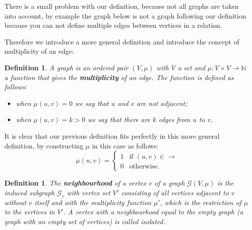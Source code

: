 \documentclass[a4paper,11pt]{report}
\newtheorem{definition}[theorem]{Definition}
\newcommand{\N}{{\mathbb N}}
\newcommand{\graf}{\mathscr{G}}
\begin{document}
There is a small problem with our definition, because not all graphs are taken 
into account, by example the  graph below is not a graph following our definition 
because you can not define multiple edges between vertices in a relation. 

  \begin{center}
\end{center}




Therefore we introduce a more general definition and introduce the concept of 
multiplicity of an edge:

\begin{definition}
  A graph is an ordered pair $(V, \mu)$ with $V$ a set and $\mu: V \times V \to \N$ a function that gives the \textbf{multiplicity} of an edge.
  The function is defined as follows:
  \begin{itemize}
    \item when $\mu(u, v) = 0$ we say that $u$ and $v$ are not adjacent;
    \item when $\mu(u, v) = k > 0$ we say that there are $k$ edges from $u$ to 
    $v$.
  \end{itemize} 
\end{definition}
It is clear that our previous definition fits perfectly in this more general definition, by constructing $\mu$ in this case as follows:
$$\mu(u,v)= \begin{cases} 1 &\mbox{if } (u,v) \in \to \\ 
0 & \mbox{otherwise}. \end{cases}$$ 
 \begin{definition}
  The \textbf{neighbourhood} of a vertex $v$ of a graph $\graf(V,\mu)$ is the induced subgraph $\graf_v$ 
 with vertex set $V'$ consisting of all vertices adjacent to $v$ without $v$ itself and with the multiplicity function $\mu'$,
 which is the restriction of $\mu$ to the vertices in $V'$.
 A vertex with a neighbourhood equal to the empty graph (a graph with an empty set of vertices) is called 
 \emph{isolated}.
\end{definition}  
  
\end{document}
